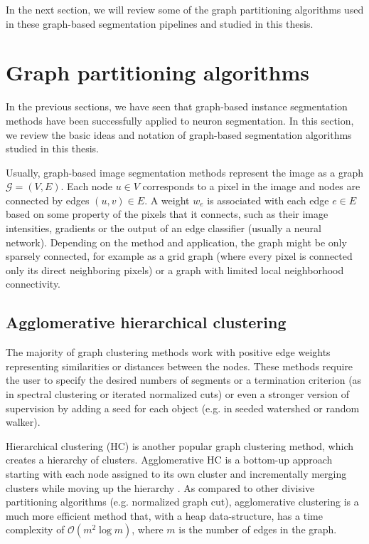 In the next section, we will review some of the graph partitioning algorithms used in these graph-based segmentation pipelines and studied in this thesis.


\section{Graph partitioning algorithms}\label{sec:graph_partitioning_intro}
In the previous sections, we have seen that graph-based instance segmentation methods have been successfully applied to neuron segmentation. In this section, we review the basic ideas and notation of graph-based segmentation algorithms studied in this thesis.

Usually, graph-based image segmentation methods represent the image as a graph $\mathcal{G}=(V,E)$. Each node $u\in V$ corresponds to a pixel in the image and nodes are connected by edges $(u,v)\in E$. A weight $w_e$ is associated with each edge $e \in E$ based on some property of the pixels that it connects, such as their image intensities, gradients or the output of an edge classifier (usually a neural network). Depending on the method and application, the graph might be only sparsely connected, for example as a grid graph (where every pixel is connected only its direct neighboring pixels) or a graph with limited local neighborhood connectivity.

\subsection{Agglomerative hierarchical clustering}
The majority of graph clustering methods work with positive edge weights representing similarities or distances between the nodes. These methods require the user to specify the desired numbers of segments or a termination criterion (as in spectral clustering or iterated normalized cuts) or even a stronger version of supervision by adding a seed for each object (e.g. in seeded watershed or random walker).  

Hierarchical clustering (HC) is another popular graph clustering method, which creates a hierarchy of clusters. Agglomerative HC is a bottom-up approach starting with each node assigned to its own cluster and incrementally merging clusters while moving up the hierarchy \cite{lance1967general}. As compared to other divisive partitioning algorithms (e.g. normalized graph cut), agglomerative clustering is a much more efficient method that, with a heap data-structure, has a time complexity of $\mathcal{O}(m^2 \log m)$, where $m$ is the number of edges in the graph. 

